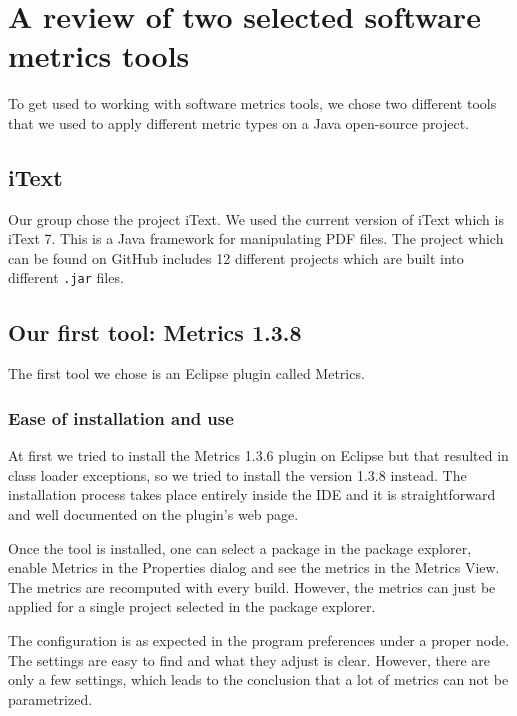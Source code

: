 \section{A review of two selected software metrics tools}
\label{review_tools_software_metrics}

To get used to working with software metrics tools, we chose two different tools that we used to apply different metric types on a Java open-source project.

\subsection{iText}

Our group chose the project iText. We used the current version of iText which is iText 7. This is a Java framework for manipulating PDF files. The project which can be found on GitHub includes 12 different projects which are built into different \verb|.jar| files.

\subsection{Our first tool: Metrics 1.3.8}

The first tool we chose is an Eclipse plugin called Metrics.
    
    \subsubsection{Ease of installation and use}
    
        At first we tried to install the Metrics 1.3.6 plugin on Eclipse but that resulted in class loader exceptions, so we tried to install the version 1.3.8 instead. The installation process takes place entirely inside the IDE and it is straightforward and well documented on the plugin's web page. 
        
        Once the tool is installed, one can select a package in the package explorer, enable Metrics in the Properties dialog and see the metrics in the Metrics View. The metrics are recomputed with every build. However, the metrics can just be applied for a single project selected in the package explorer.
        
        The configuration is as expected in the program preferences under a proper node. The settings are easy to find and what they adjust is clear. However, there are only a  few settings, which leads to the conclusion that a lot of metrics can not be parametrized.

